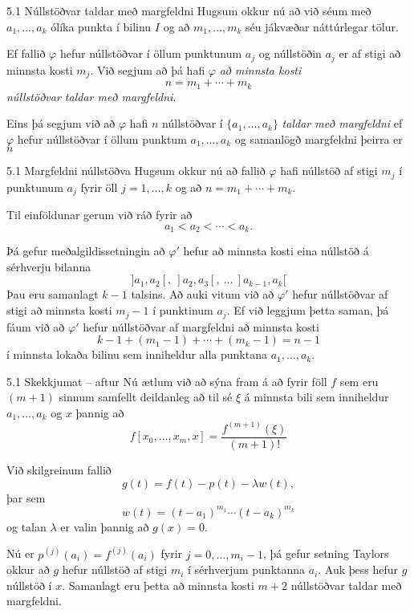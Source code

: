 \begin{frame}{5.1 Núllstöðvar taldar með margfeldni} 
Hugsum okkur nú að við séum með $a_1,\dots,a_k$ ólíka punkta í bilinu 
$I$  og að $m_1,\dots,m_k$ séu jákvæðar náttúrlegar tölur.

\pause
Ef fallið $\varphi$ hefur núllstöðvar í öllum punktunum $a_j$ og 
núllstöðin $a_j$ er af stigi að minnsta kosti $m_j$.  Við segjum að þá
hafi $\varphi$ {\it að minnsta kosti} 
$$
n=m_1+\cdots+m_k
$$
{\it núllstöðvar taldar með margfeldni}.

\pause
\smallskip
Eins þá segjum við að  $\varphi$ hafi $n$ núllstöðvar í $\{a_1,\dots,a_k\}$ 
{\it taldar með margfeldni} ef $\varphi$ hefur 
núllstöðvar í öllum punktum $a_1,\dots,a_k$ og samanlögð margfeldni
þeirra er  $n$
\end{frame}

\begin{frame}{5.1 Margfeldni núllstöðva} 
Hugsum okkur nú að fallið $\varphi$ hafi núllstöð af stigi 
$m_j$ í punktunum $a_j$ fyrir öll $j=1,\dots,k$ og að
$n=m_1+\cdots+m_k$.  

\pause
\smallskip
Til einföldunar gerum við ráð fyrir að 
$$
a_1<a_2<\cdots<a_k.
$$

\pause
\smallskip
Þá gefur meðalgildissetningin að $\varphi'$ hefur að minnsta kosti eina
núllstöð á sérhverju bilanna 
$$
]a_1,a_2[, \  ]a_2,a_3[, \ \dots \  ]a_{k-1},a_k[ 
$$
Þau eru samanlagt $k-1$ talsins.  Að auki vitum við að 
$\varphi'$ hefur núllstöðvar af stigi að minnsta kosti 
$m_j-1$ í punktinum $a_j$.   Ef við leggjum þetta saman, þá fáum við
að $\varphi'$ hefur núllstöðvar af margfeldni að minnsta kosti 
$$
k-1+(m_1-1)+\cdots+(m_k-1)=n-1
$$
í minnsta lokaða bilinu sem inniheldur alla punktana $a_1,\dots,a_k$.  
\end{frame}

\begin{frame}{5.1 Skekkjumat -- aftur} 
Nú ætlum við að sýna fram á að fyrir föll $f$ sem eru $(m+1)$ sinnum 
samfellt deildanleg að til sé $\xi$ á minnsta bili sem inniheldur 
$a_1, \ldots, a_k$ og $x$ þannig að
\begin{equation*}
  f[x_0,\ldots,x_m,x] = \frac{f^{(m+1)}(\xi)}{(m+1)!}
\end{equation*}

\pause
\smallskip
Við skilgreinum fallið
\begin{equation*}
  g(t) = f(t) - p(t) - \lambda w(t),
\end{equation*}
þar sem
\begin{equation*}
  w(t) = (t-a_1)^{m_1} \cdots (t-a_k)^{m_k}
\end{equation*}
og talan $\lambda$ er valin þannig að $g(x) = 0$. 

\pause
\smallskip
Nú er $p^{(j)}(a_i)=f^{(j)}(a_i)$  fyrir $j=0,\dots,m_i-1$,   
þá gefur setning Taylors okkur að $g$
hefur núllstöð  af stigi $m_i$ í sérhverjum punktanna $a_i$.
Auk þess hefur $g$ núllstöð í $x$.  Samanlagt eru þetta  að minnsta
kosti 
$m+2$ núllstöðvar taldar með margfeldni.
\end{frame}

